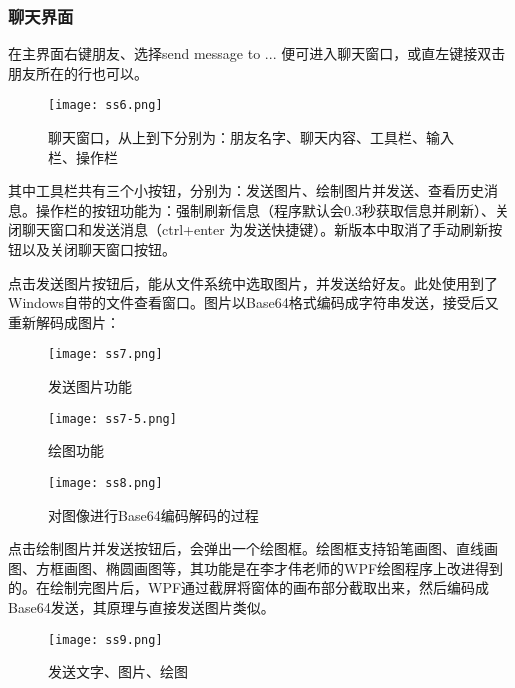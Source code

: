 \documentclass[a4paper,11pt]{article}
\begin{document}
        \subsubsection{聊天界面}
            在主界面右键朋友、选择send message to ... 便可进入聊天窗口，或直左键接双击朋友所在的行也可以。\par
            \begin{figure}[H]
                \centering
                \texttt{[image: ss6.png]}
                \caption{聊天窗口，从上到下分别为：朋友名字、聊天内容、工具栏、输入栏、操作栏}
            \end{figure}
            其中工具栏共有三个小按钮，分别为：发送图片、绘制图片并发送、查看历史消息。操作栏的按钮功能为：强制刷新信息（程序默认会0.3秒获取信息并刷新）、关闭聊天窗口和发送消息（ctrl+enter 为发送快捷键）。新版本中取消了手动刷新按钮以及关闭聊天窗口按钮。\par
            点击发送图片按钮后，能从文件系统中选取图片，并发送给好友。此处使用到了Windows自带的文件查看窗口。图片以Base64格式编码成字符串发送，接受后又重新解码成图片：\par
            \begin{figure}[H]
                \centering
                \texttt{[image: ss7.png]}
                \caption{发送图片功能}
            \end{figure}
            \begin{figure}[H]
                \centering
                \texttt{[image: ss7-5.png]}
                \caption{绘图功能}
            \end{figure}
            \begin{figure}[H]
                \centering
                \texttt{[image: ss8.png]}
                \caption{对图像进行Base64编码解码的过程}
            \end{figure}
            点击绘制图片并发送按钮后，会弹出一个绘图框。绘图框支持铅笔画图、直线画图、方框画图、椭圆画图等，其功能是在李才伟老师\textsuperscript{\cite{5}}的WPF绘图程序上改进得到的。在绘制完图片后，WPF通过截屏将窗体的画布部分截取出来，然后编码成Base64发送，其原理与直接发送图片类似。\par
            \begin{figure}[H]
                \centering
                \texttt{[image: ss9.png]}
                \caption{发送文字、图片、绘图}
            \end{figure}
\end{document}
